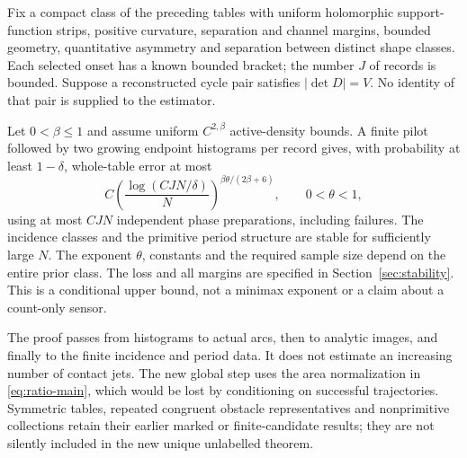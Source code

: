 \begin{theorem}\label{thm:stat-main}
Fix a compact class of the preceding tables with uniform holomorphic
support-function strips, positive curvature, separation and channel
margins, bounded geometry, quantitative asymmetry and separation between
distinct shape classes. Each selected onset has a known bounded bracket;
the number $J$ of records is bounded. Suppose a reconstructed cycle pair
satisfies $|\det D|=V$. No identity of that pair is supplied to the estimator.

Let $0<\beta\le1$ and assume uniform $C^{2,\beta}$ active-density bounds.
A finite pilot followed by two growing endpoint histograms per record
gives, with probability at least $1-\delta$, whole-table error at most
\begin{equation}\label{eq:rate-main}
 C\left(\frac{\log(CJN/\delta)}{N}\right)^{\beta\theta/(2\beta+6)},
                       \qquad 0<\theta<1,
\end{equation}
using at most $CJN$ independent phase preparations, including failures.
The incidence classes and the primitive period structure are stable for
sufficiently large $N$. The exponent $\theta$, constants and the required
sample size depend on the entire prior class. The loss and all margins
are specified in Section~\ref{sec:stability}. This is a conditional upper
bound, not a minimax exponent or a claim about a count-only sensor.
\end{theorem}

The proof passes from histograms to actual arcs, then to analytic images,
and finally to the finite incidence and period data. It does not estimate
an increasing number of contact jets. The new global step uses the area
normalization in \eqref{eq:ratio-main}, which would be lost by conditioning
on successful trajectories. Symmetric tables, repeated congruent obstacle
representatives and nonprimitive collections retain their earlier marked
or finite-candidate results; they are not silently included in the new
unique unlabelled theorem.
